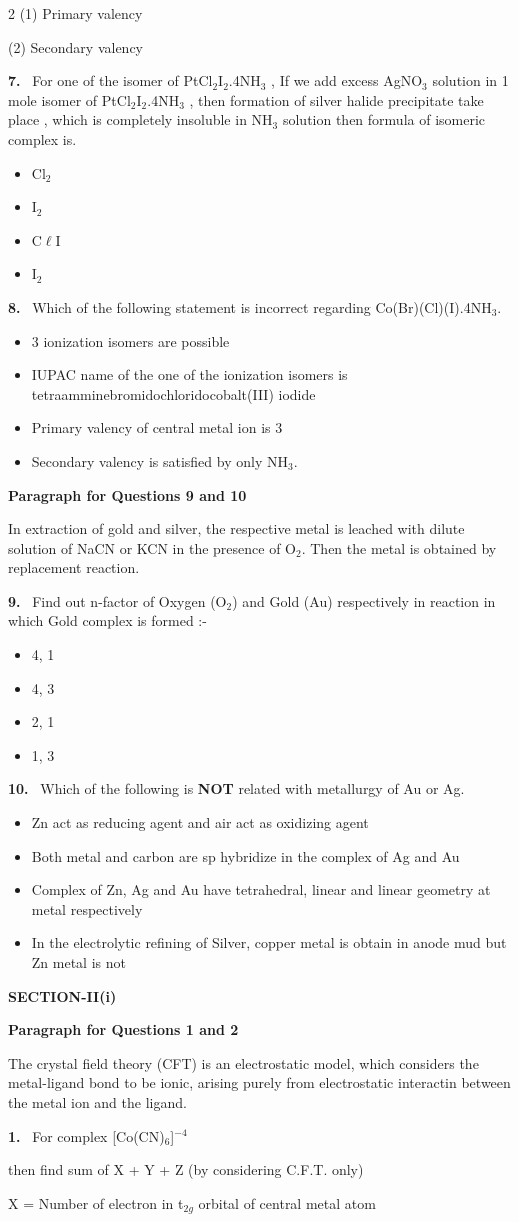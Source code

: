 \documentclass[10pt]{extarticle}
\newcommand{\sect}[1]{\par\smallskip\noindent\textbf{#1}\par}
\newcommand{\qn}[1]{\par\smallskip\noindent\textbf{#1.}~}
\newcommand{\paraq}[2]{\par\smallskip\noindent\textbf{Paragraph for Questions #1 and #2}\par}
\newenvironment{qoptions}{\begin{itemize}[leftmargin=1.8em,itemsep=1pt,topsep=2pt,label={}]}{\end{itemize}}
\newcommand{\opt}[2]{\item[(#1)] #2}
\begin{document}
\begin{multicols}{2}
(1) Primary valency\par
(2) Secondary valency
\qn{7} For one of the isomer of PtCl$_2$I$_2$.4NH$_3$ , If we add excess AgNO$_3$ solution in 1 mole isomer of PtCl$_2$I$_2$.4NH$_3$ , then formation of silver halide precipitate take place , which is completely insoluble in NH$_3$ solution then formula of isomeric complex is.
\begin{qoptions}
\opt{A}{[Pt(NH$_3$)$_4$I$_2$]Cl$_2$}
\opt{B}{[Pt(NH$_3$)$_4$Cl$_2$]I$_2$}
\opt{C}{[Pt(NH$_3$)$_4$C$\ell$I]C$\ell$I}
\opt{D}{[Pt(NH$_3$)$_5$Cl$_2$]I$_2$}
\end{qoptions}
\qn{8} Which of the following statement is incorrect regarding Co(Br)(Cl)(I).4NH$_3$.
\begin{qoptions}
\opt{A}{3 ionization isomers are possible}
\opt{B}{IUPAC name of the one of the ionization isomers is tetraamminebromidochloridocobalt(III) iodide}
\opt{C}{Primary valency of central metal ion is 3}
\opt{D}{Secondary valency is satisfied by only NH$_3$.}
\end{qoptions}
\paraq{9}{10}
In extraction of gold and silver, the respective metal is leached with dilute solution of NaCN or KCN in the presence of O$_2$. Then the metal is obtained by replacement reaction.
\qn{9} Find out n-factor of Oxygen (O$_2$) and Gold (Au) respectively in reaction in which Gold complex is formed :-
\begin{qoptions}
\opt{A}{4, 1}
\opt{B}{4, 3}
\opt{C}{2, 1}
\opt{D}{1, 3}
\end{qoptions}
\qn{10} Which of the following is \textbf{NOT} related with metallurgy of Au or Ag.
\begin{qoptions}
\opt{A}{Zn act as reducing agent and air act as oxidizing agent}
\opt{B}{Both metal and carbon are sp hybridize in the complex of Ag and Au}
\opt{C}{Complex of Zn, Ag and Au have tetrahedral, linear and linear geometry at metal respectively}
\opt{D}{In the electrolytic refining of Silver, copper metal is obtain in anode mud but Zn metal is not}
\end{qoptions}
\sect{SECTION-II(i)}
\paraq{1}{2}
The crystal field theory (CFT) is an electrostatic model, which considers the metal-ligand bond to be ionic, arising purely from electrostatic interactin between the metal ion and the ligand.
\qn{1} For complex [Co(CN)$_6$]$^{-4}$\par
then find sum of X + Y + Z (by considering C.F.T. only)\par
X = Number of electron in t$_{2g}$ orbital of central metal atom\par

\end{multicols}
\end{document}
